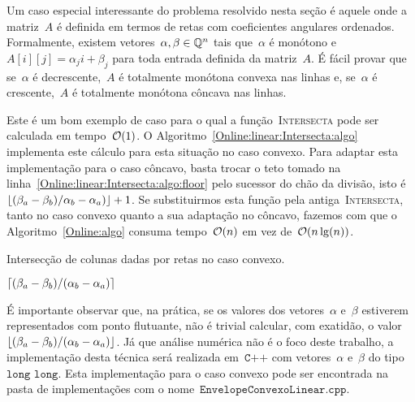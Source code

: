 Um caso especial interessante do problema resolvido nesta seção é aquele onde a matriz~$A$ é definida em termos de retas com coeficientes angulares ordenados. Formalmente, existem vetores~$\alpha,\beta \in \mathbb{Q}^n$ tais que~$\alpha$ é monótono e~$A[i][j] = \alpha_j i + \beta_j$ para toda entrada definida da matriz~$A$. É fácil provar que se~$\alpha$ é decrescente,~$A$ é totalmente monótona convexa nas linhas e, se~$\alpha$ é crescente,~$A$ é totalmente monótona côncava nas linhas.

Este é um bom exemplo de caso para o qual a função~\textsc{Intersecta} pode ser calculada em tempo~$\mathcal{O}(1)$. O Algoritmo~\ref{Online:linear:Intersecta:algo} implementa este cálculo para esta situação no caso convexo. Para adaptar esta implementação para o caso côncavo, basta trocar o teto tomado na linha~\ref{Online:linear:Intersecta:algo:floor} pelo sucessor do chão da divisão, isto é~${\lfloor(\beta_a - \beta_b)/\alpha_b - \alpha_a)\rfloor + 1}$. Se substituirmos esta função pela antiga~\textsc{Intersecta}, tanto no caso convexo quanto a sua adaptação no côncavo, fazemos com que o Algoritmo~\ref{Online:algo} consuma tempo~$\mathcal{O}(n)$ em vez de~$\mathcal{O}(n\lg(n))$.


\begin{algorithm}[h]
\caption{Intersecção de colunas dadas por retas no caso convexo. }
\label{Online:linear:Intersecta:algo}
\begin{algorithmic}[1]
    \State \Return $\lceil(\beta_a - \beta_b)/(\alpha_b - \alpha_a)\rceil$ \label{Online:linear:Intersecta:algo:floor}
\EndFunction
\end{algorithmic}
\end{algorithm}

É importante observar que, na prática, se os valores dos vetores~$\alpha$ e~$\beta$ estiverem representados com ponto flutuante, não é trivial calcular, com exatidão, o valor~$\lfloor(\beta_a - \beta_b)/(\alpha_b - \alpha_a)\rfloor$. Já que análise numérica não é o foco deste trabalho, a implementação desta técnica será realizada em~$\texttt{C++}$ com vetores~$\alpha$ e~$\beta$ do tipo~$\texttt{long long}$. Esta implementação para o caso convexo pode ser encontrada na pasta de implementações com o nome~$\texttt{EnvelopeConvexoLinear.cpp}$.
